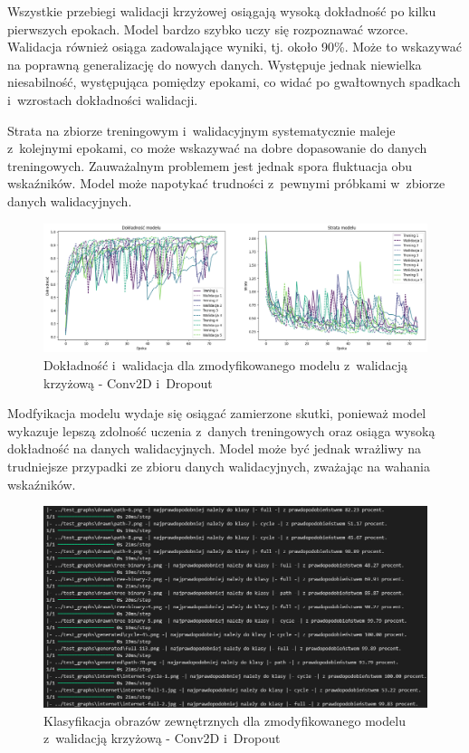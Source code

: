 Wszystkie przebiegi walidacji krzyżowej osiągają wysoką dokładność po kilku pierwszych epokach.
Model bardzo szybko uczy się rozpoznawać wzorce.
Walidacja również osiąga zadowalające wyniki, tj. około 90\%. Może to wskazywać na poprawną generalizację do nowych danych.
Występuje jednak niewielka niesabilność, występująca pomiędzy epokami,
co widać po gwałtownych spadkach i~wzrostach dokładności walidacji.

Strata na zbiorze treningowym i~walidacyjnym systematycznie maleje z~kolejnymi epokami,
co może wskazywać na dobre dopasowanie do danych treningowych.
Zauważalnym problemem jest jednak spora fluktuacja obu wskaźników.
Model może napotykać trudności z~pewnymi próbkami w~zbiorze danych walidacyjnych. 

\begin{figure}[ht]
	\centering
	\includegraphics[width=15.5cm]{resources/tests/images/v4/crossvalid_1_img.png}
	\caption{Dokładność i~walidacja dla zmodyfikowanego modelu z~walidacją krzyżową - Conv2D i~Dropout}
	\label{Fig:tests-cv-1a}
\end{figure}
\FloatBarrier

Modfyikacja modelu wydaje się osiągać zamierzone skutki,
ponieważ model wykazuje lepszą zdolność uczenia z~danych treningowych
oraz osiąga wysoką dokładność na danych walidacyjnych.
Model może być jednak wrażliwy na trudniejsze przypadki ze zbioru danych walidacyjnych,
zważając na wahania wskaźników.

\begin{figure}[ht]
	\centering
	\includegraphics[width=15.5cm]{resources/tests/images/v4/crossvalid_1_txt.png}
	\caption{Klasyfikacja obrazów zewnętrznych dla zmodyfikowanego modelu z~walidacją krzyżową - Conv2D i~Dropout}
	\label{Fig:tests-cv-1b}
\end{figure}
\FloatBarrier

